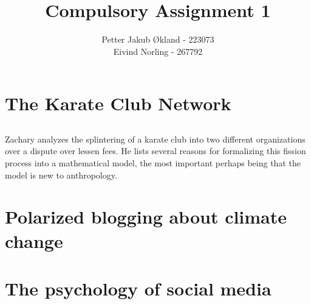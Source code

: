 \documentclass[11pt]{article}
\title{ Compulsory Assignment 1}
\author{ Petter Jakub Økland - 223073\\
Eivind Norling - 267792}
\begin{document}
\maketitle

\section{The Karate Club Network}
\subsection{}
\subsection{}
Zachary analyzes the splintering of a karate club into two different organizations
over a dispute over lessen fees. He lists several reasons for formalizing this fission
process into a mathematical model, the most important perhaps being that the model is
new to anthropology.

\section{Polarized blogging about climate change}


\section{The psychology of social media}




\end{document}
